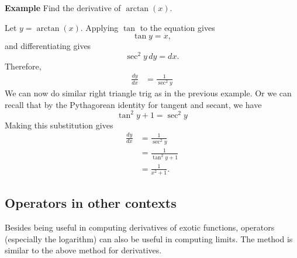 \documentclass[twoside,openright,titlepage,a4paper]{book}
\begin{document}
\begin{sloppypar}
\textbf{Example} Find the derivative of $\arctan(x)$.
\begin{examplebox}
Let $y = \arctan(x)$. Applying $\tan$ to the equation gives \[ \tan y = x, \] and differentiating gives \[ \sec^2y\,dy = dx. \]
Therefore,
\begin{align*}
\frac{dy}{dx} &= \frac{1}{\sec^2y}
\end{align*}
We can now do similar right triangle trig as in the previous example. Or we can recall that by the Pythagorean identity for tangent and secant, we have \[ \tan^2y + 1 = \sec^2y \] 
Making this substitution gives
\begin{align*}
\frac{dy}{dx} &= \frac{1}{\sec^2y} \\
&= \frac{1}{\tan^2y + 1} \\
&= \frac{1}{x^2+1}. 
\end{align*}
\end{examplebox}

\subsection{Operators in other contexts}

Besides being useful in computing derivatives of exotic functions, operators (especially the logarithm) can also be useful in computing limits. The method is similar to the above method for derivatives.


\end{sloppypar}
\end{document}
